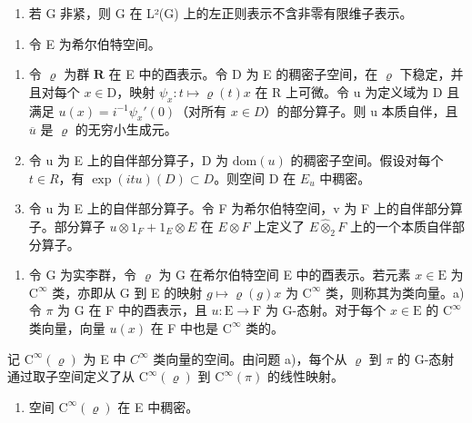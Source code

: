 \begin{enumerate}
\def\labelenumi{\alph{enumi})}
\setcounter{enumi}{1}
\tightlist
\item
  若 G 非紧，则 G 在 L²(G) 上的左正则表示不含非零有限维子表示。
\end{enumerate}

\begin{enumerate}
\def\labelenumi{\arabic{enumi})}
\setcounter{enumi}{10}
\tightlist
\item
  令 E 为希尔伯特空间。
\end{enumerate}

\begin{enumerate}
\def\labelenumi{\alph{enumi})}
\item
  令 \(\varrho\) 为群 \(\mathbf{R}\) 在 E 中的酉表示。令 D 为 E 的稠密子空间，在 \(\varrho\) 下稳定，并且对每个 \(x\in\mathrm{D}\)，映射 \(\psi_{x}:t\mapsto\varrho(t)x\) 在 R 上可微。令 u 为定义域为 D 且满足 \(u(x) = i^{-1}\psi_x'(0)\)（对所有 \(x \in D\)）的部分算子。则 u 本质自伴，且 \(\overline{u}\) 是 \(\varrho\) 的无穷小生成元。
\item
  令 u 为 E 上的自伴部分算子，D 为 \(\text{dom}(u)\) 的稠密子空间。假设对每个 \(t \in R\)，有 \(\exp(itu)(D) \subset D\)。则空间 D 在 \(E_{u}\) 中稠密。
\item
  令 u 为 E 上的自伴部分算子。令 F 为希尔伯特空间，v 为 F 上的自伴部分算子。部分算子 \(u \otimes 1_{F} + 1_{E} \otimes E\) 在 \(E \otimes F\) 上定义了 \(E \widehat{\otimes}_{2} F\) 上的一个本质自伴部分算子。
\end{enumerate}

\begin{enumerate}
\def\labelenumi{\arabic{enumi})}
\setcounter{enumi}{11}
\tightlist
\item
  令 G 为实李群，令 \(\varrho\) 为 G 在希尔伯特空间 E 中的酉表示。若元素 \(x \in \mathrm{E}\) 为 \(\mathrm{C}^{\infty}\) 类，亦即从 G 到 E 的映射 \(g \mapsto \varrho(g)x\) 为 \(\mathrm{C}^{\infty}\) 类，则称其为类向量。a) 令 \(\pi\) 为 G 在 F 中的酉表示，且 \(u: \mathrm{E} \to \mathrm{F}\) 为 G-态射。对于每个 \(x \in \mathrm{E}\) 的 \(\mathrm{C}^{\infty}\) 类向量，向量 \(u(x)\) 在 F 中也是 \(\mathrm{C}^{\infty}\) 类的。
\end{enumerate}

记 \(\mathrm{C}^{\infty}(\varrho)\) 为 E 中 \(C^{\infty}\) 类向量的空间。由问题 a)，每个从 \(\varrho\) 到 \(\pi\) 的 G-态射通过取子空间定义了从 \(\mathrm{C}^{\infty}(\varrho)\) 到 \(\mathrm{C}^{\infty}(\pi)\) 的线性映射。

\begin{enumerate}
\def\labelenumi{\alph{enumi})}
\setcounter{enumi}{1}
\tightlist
\item
  空间 \(\mathrm{C}^{\infty}(\varrho)\) 在 E 中稠密。
\end{enumerate}

